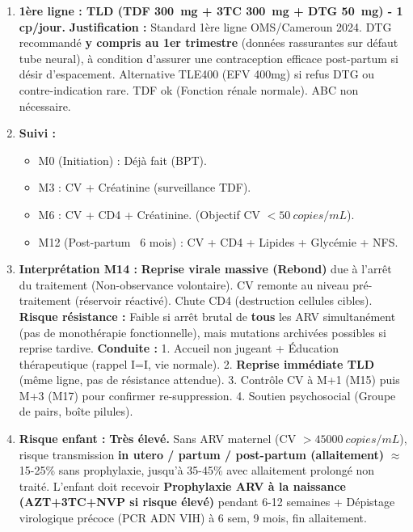 \documentclass[11pt]{article}
\begin{document}
\begin{corrige}
\begin{enumerate}
    \item \textbf{1ère ligne : TLD (TDF \SI{300}{mg} + 3TC \SI{300}{mg} + DTG \SI{50}{mg}) - 1 cp/jour.}
    \textbf{Justification :} Standard 1ère ligne OMS/Cameroun 2024. DTG recommandé \textbf{y compris au 1er trimestre} (données rassurantes sur défaut tube neural), à condition d'assurer une contraception efficace post-partum si désir d'espacement. Alternative TLE400 (EFV 400mg) si refus DTG ou contre-indication rare. TDF ok (Fonction rénale normale). ABC non nécessaire.
    \item \textbf{Suivi :}
    \begin{itemize}
        \item M0 (Initiation) : Déjà fait (BPT).
        \item M3 : CV + Créatinine (surveillance TDF).
        \item M6 : CV + CD4 + Créatinine. (Objectif CV $< \SI{50}{copies/mL}$).
        \item M12 (Post-partum ~6 mois) : CV + CD4 + Lipides + Glycémie + NFS.
    \end{itemize}
    \item \textbf{Interprétation M14 :} \textbf{Reprise virale massive (Rebond)} due à l'arrêt du traitement (Non-observance volontaire). CV remonte au niveau pré-traitement (réservoir réactivé). Chute CD4 (destruction cellules cibles). \textbf{Risque résistance :} Faible si arrêt brutal de \textbf{tous} les ARV simultanément (pas de monothérapie fonctionnelle), mais mutations archivées possibles si reprise tardive.
    \textbf{Conduite :} 1. Accueil non jugeant + Éducation thérapeutique (rappel I=I, vie normale). 2. \textbf{Reprise immédiate TLD} (même ligne, pas de résistance attendue). 3. Contrôle CV à M+1 (M15) puis M+3 (M17) pour confirmer re-suppression. 4. Soutien psychosocial (Groupe de pairs, boîte pilules).
    \item \textbf{Risque enfant :} \textbf{Très élevé.} Sans ARV maternel (CV $> \SI{45000}{copies/mL}$), risque transmission \textbf{in utero / partum / post-partum (allaitement)} $\approx$ 15-25\% sans prophylaxie, jusqu'à 35-45\% avec allaitement prolongé non traité. L'enfant doit recevoir \textbf{Prophylaxie ARV à la naissance (AZT+3TC+NVP si risque élevé)} pendant 6-12 semaines + Dépistage virologique précoce (PCR ADN VIH) à 6 sem, 9 mois, fin allaitement.
\end{enumerate}
\end{corrige}
\end{document}
